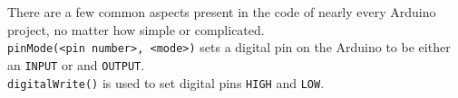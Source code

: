 \documentclass[../TinyBot.tex]{subfiles}
\begin{document}
There are a few common aspects present in the code of nearly every Arduino project, no matter how simple or complicated. \\


\lstinline[]!pinMode(<pin number>, <mode>)! sets a digital pin on the Arduino to be either an \lstinline[]!INPUT! or and \lstinline[]!OUTPUT!. \\


\lstinline[]!digitalWrite()! is used to set digital pins \lstinline[]!HIGH! and \lstinline[]!LOW!.
\end{document}
